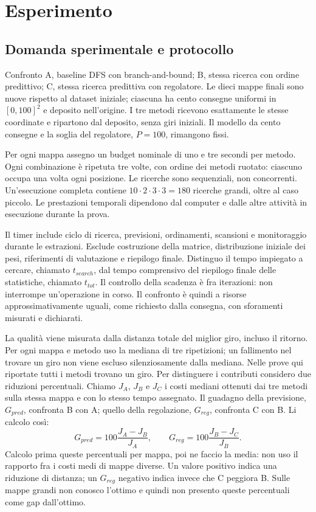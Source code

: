 \section{Esperimento}
\label{sec:experiment}
\subsection{Domanda sperimentale e protocollo}
Confronto A, baseline DFS con branch-and-bound; B, stessa ricerca con ordine
predittivo; C, stessa ricerca predittiva con regolatore. Le dieci mappe finali
sono nuove rispetto al dataset iniziale; ciascuna ha cento consegne uniformi
in $[0,100]^2$ e deposito nell'origine. I tre metodi ricevono esattamente le
stesse coordinate e ripartono dal deposito, senza giri iniziali.
Il modello da cento consegne e la soglia del regolatore, $P=100$, rimangono fissi.

Per ogni mappa assegno un budget nominale di uno e tre secondi per metodo.
Ogni combinazione è ripetuta tre volte, con ordine dei metodi ruotato: ciascuno
occupa una volta ogni posizione. Le ricerche sono sequenziali, non concorrenti.
Un'esecuzione completa contiene $10\cdot2\cdot3\cdot3=180$ ricerche grandi,
oltre al caso piccolo. Le prestazioni temporali dipendono dal computer e dalle altre attività
in esecuzione durante la prova.

Il timer include ciclo di ricerca, previsioni, ordinamenti, scansioni e
monitoraggio durante le estrazioni. Esclude costruzione della matrice,
distribuzione iniziale dei pesi, riferimenti di valutazione e riepilogo finale. Distinguo il tempo impiegato a cercare, chiamato $t_{search}$, dal tempo
comprensivo del riepilogo finale delle statistiche, chiamato $t_{tot}$. Il controllo della scadenza è fra iterazioni: non interrompe
un'operazione in corso. Il confronto è quindi a risorse approssimativamente
uguali, come richiesto dalla consegna, con sforamenti misurati e dichiarati.

La qualità viene misurata dalla distanza totale del miglior giro, incluso il ritorno.
Per ogni mappa e metodo uso la mediana di tre ripetizioni; un fallimento nel
trovare un giro non viene escluso silenziosamente dalla mediana. Nelle prove
qui riportate tutti i metodi trovano un giro. Per distinguere i contributi considero due riduzioni percentuali.
Chiamo $J_A$, $J_B$ e $J_C$ i costi mediani ottenuti dai tre metodi sulla
stessa mappa e con lo stesso tempo assegnato. Il guadagno della previsione,
$G_{pred}$, confronta B con A; quello della regolazione, $G_{reg}$,
confronta C con B. Li calcolo così:
\[
 G_{pred}=100\frac{J_A-J_B}{J_A},\qquad
 G_{reg}=100\frac{J_B-J_C}{J_B}.
\]
Calcolo prima queste percentuali per mappa, poi ne faccio la media:
non uso il rapporto fra i costi medi di mappe diverse. Un valore positivo indica una riduzione di distanza; un $G_{reg}$ negativo
indica invece che C peggiora B. Sulle mappe grandi non conosco l'ottimo e quindi
non presento queste percentuali come gap dall'ottimo.

